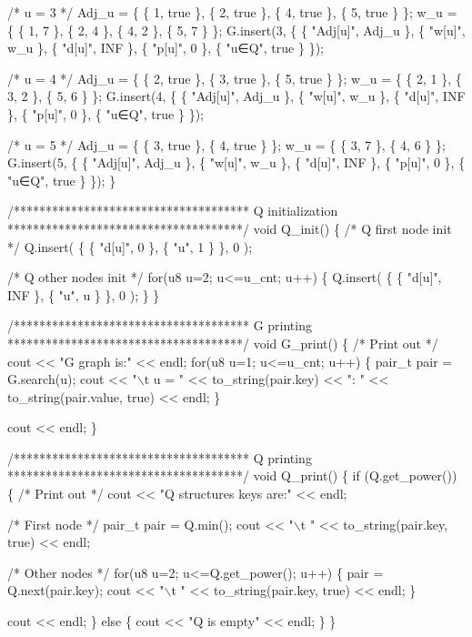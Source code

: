 \begin{DoxyCode}
  /* u = 3 */
  Adj\_u  = \{ \{ 1, true \}, \{ 2, true \}, \{ 4, true \}, \{ 5, true \} \};
  w\_u    = \{ \{ 1, 7    \}, \{ 2, 4    \}, \{ 4, 2    \}, \{ 5, 7    \} \};
  G.insert(3, \{
    \{ "Adj[u]", Adj\_u \},
    \{ "w[u]",   w\_u   \},
    \{ "d[u]",   INF   \},
    \{ "p[u]",   0     \},
    \{ "u∈Q",    true  \} 
  \});

  /* u = 4 */
  Adj\_u  = \{ \{ 2, true \}, \{ 3, true \}, \{ 5, true \} \};
  w\_u    = \{ \{ 2, 1    \}, \{ 3, 2    \}, \{ 5, 6    \} \};
  G.insert(4, \{
    \{ "Adj[u]", Adj\_u \},
    \{ "w[u]",   w\_u   \},
    \{ "d[u]",   INF   \},
    \{ "p[u]",   0     \},
    \{ "u∈Q",    true  \} 
  \});

  /* u = 5 */
  Adj\_u  = \{ \{ 3, true \}, \{ 4, true \} \};
  w\_u    = \{ \{ 3, 7    \}, \{ 4, 6    \} \};
  G.insert(5, \{
    \{ "Adj[u]", Adj\_u \},
    \{ "w[u]",   w\_u   \},
    \{ "d[u]",   INF   \},
    \{ "p[u]",   0     \},
    \{ "u∈Q",    true  \} 
  \});
\}

/*************************************
  Q initialization
*************************************/
void Q\_init()
\{
  /* Q first node init */
  Q.insert(
    \{ \{ "d[u]", 0 \},  \{ "u", 1 \} \},
    0
  );

  /* Q other nodes init */
  for(u8 u=2; u<=u\_cnt; u++)
  \{
    Q.insert(
      \{ \{ "d[u]", INF \},  \{ "u", u \} \},
      0
    );
  \}
\}

/*************************************
  G printing
*************************************/
void G\_print()
\{
  /* Print out */
  cout << "G graph is:" << endl;
  for(u8 u=1; u<=u\_cnt; u++)
  \{
    pair\_t pair =  G.search(u);
    cout << "\(\backslash\)t u = " << to\_string(pair.key) <<
      ":  " << to\_string(pair.value, true) << endl;
  \}

  cout << endl;
\}

/*************************************
  Q printing
*************************************/
void Q\_print()
\{
  if (Q.get\_power())
  \{
    /* Print out */
    cout << "Q structures keys are:" << endl;

    /* First node */
    pair\_t pair = Q.min();
    cout << "\(\backslash\)t " << to\_string(pair.key, true) << endl;

    /* Other nodes */
    for(u8 u=2; u<=Q.get\_power(); u++)
    \{
      pair = Q.next(pair.key);
      cout << "\(\backslash\)t " << to\_string(pair.key, true) << endl;
    \}

    cout << endl;
  \}
  else
  \{
    cout << "Q is empty" << endl;
  \}
\}
\end{DoxyCode}
 